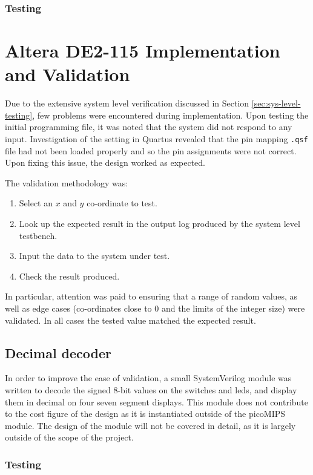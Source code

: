 \subsubsection{Testing}

\section{Altera DE2-115 Implementation and Validation} \label{sec:implementation}
Due to the extensive system level verification discussed in Section \ref{sec:sys-level-testing}, few problems were encountered during implementation. Upon testing the initial programming file, it was noted that the system did not respond to any input. Investigation of the setting in Quartus revealed that the pin mapping \texttt{.qsf} file had not been loaded properly and so the pin assignments were not correct. Upon fixing this issue, the design worked as expected.

The validation methodology was:
\begin{enumerate}
	 \item Select an $x$ and $y$ co-ordinate to test.
	 \item Look up the expected result in the output log produced by the system level testbench.
	 \item Input the data to the system under test.
	 \item Check the result produced.
\end{enumerate}
In particular, attention was paid to ensuring that a range of random values, as well as edge cases (co-ordinates close to $0$ and the limits of the integer size) were validated. In all cases the tested value matched the expected result.


\subsection{Decimal decoder}
In order to improve the ease of validation, a small SystemVerilog module was written to decode the signed 8-bit values on the switches and \glspl{led}, and display them in decimal on four seven segment displays. This module does not contribute to the cost figure of the design as it is instantiated outside of the picoMIPS module. The design of the module will not be covered in detail, as it is largely outside of the scope of the project.

\subsubsection{Testing}


